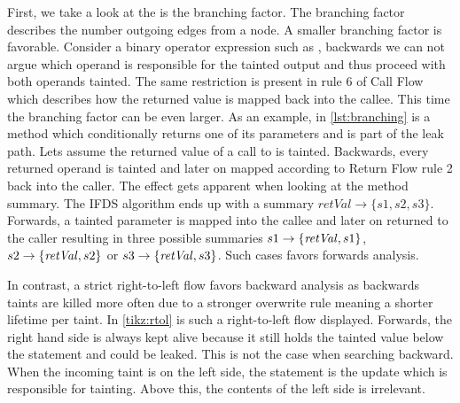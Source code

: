 \documentclass[../draft.tex]{subfiles}
\begin{document}
    First, we take a look at the is the branching factor. The branching factor describes the number outgoing edges from a node. A smaller branching factor is favorable.   
    Consider a binary operator expression such as , backwards we can not argue which operand is responsible for the tainted output and thus proceed with both operands tainted. The same restriction is present in rule 6 of Call Flow which describes how the returned value is mapped back into the callee. This time the branching factor can be even larger. As an example, in \autoref{lst:branching} is a method which conditionally returns one of its parameters and is part of the leak path. Lets assume the returned value of a call to  is tainted. Backwards, every returned operand is tainted and later on mapped according to Return Flow rule 2 back into the caller. The effect gets apparent when looking at the method summary. The IFDS algorithm ends up with a summary $\mathit{retVal} \rightarrow \{s1, s2, s3\}$. Forwards, a tainted parameter is mapped into the callee and later on returned to the caller resulting in three possible summaries  $s1 \rightarrow \mathit\{\mathit{retVal}, s1\}$, $s2 \rightarrow \mathit\{\mathit{retVal}, s2\}$ or $s3 \rightarrow \mathit\{\mathit{retVal}, s3\}$. Such cases favors forwards analysis.

    In contrast, a strict right-to-left flow favors backward analysis as backwards taints are killed more often due to a stronger overwrite rule meaning a shorter lifetime per taint. In \autoref{tikz:rtol} is such a right-to-left flow displayed. Forwards, the right hand side is always kept alive because it still holds the tainted value below the statement and could be leaked. 
    This is not the case when searching backward. When the incoming taint is on the left side, the statement is the update which is responsible for tainting. Above this, the contents of the left side is irrelevant.
\end{document}
